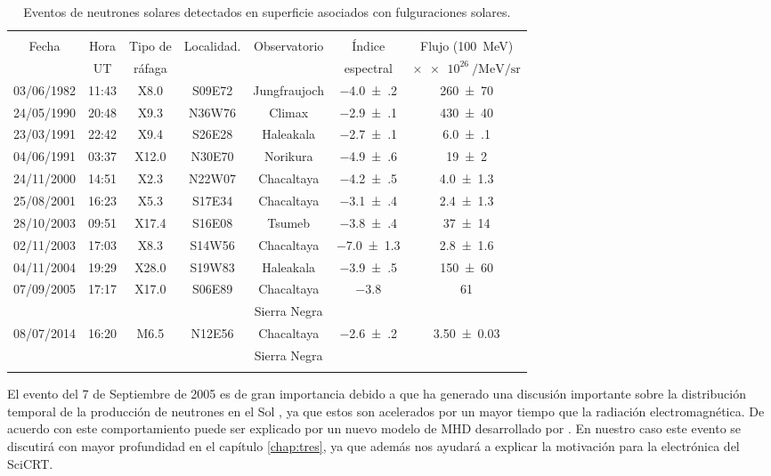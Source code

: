 \begin{table}
\caption{Eventos de neutrones solares detectados en superficie asociados con fulguraciones solares.}
\label{table:eventos-neutrones}

\begin{tabular}{ccccccc}
\multicolumn{7}{c}{}\\
\cmidrule(r){1-7}
Fecha & Hora & Tipo de & Localidad. & Observatorio & Índice & Flujo (\SI{100}{\mega\electronvolt})\\
 & UT & ráfaga &  &  & espectral & $\times\SI{e26}{\per\mega\electronvolt\per\steradian}$ \\
\addlinespace[5pt]
\cmidrule(r){1-7}
\num{03}/\num{06}/\num{1982} & 11:43 & X8.0 & S09E72 & Jungfraujoch & \num{-4.0(2)} & \num{260(70)}\\
\num{24}/\num{05}/\num{1990} & 20:48 & X9.3 & N36W76 & Climax & \num{-2.9(1)} & \num{430(40)}\\
\num{23}/\num{03}/\num{1991} & 22:42 & X9.4 & S26E28 & Haleakala & \num{-2.7(1)} & \num{6.0(1)}\\
\num{04}/\num{06}/\num{1991} & 03:37 & X12.0 & N30E70 & Norikura & \num{-4.9(6)} & \num{19(2)}\\
\num{24}/\num{11}/\num{2000} & 14:51 & X2.3 & N22W07 & Chacaltaya & \num{-4.2(5)} & \num{4.0(13)}\\
\num{25}/\num{08}/\num{2001} & 16:23 & X5.3 & S17E34 & Chacaltaya & \num{-3.1(4)} & \num{2.4(13)}\\
\num{28}/\num{10}/\num{2003} & 09:51 & X17.4 & S16E08 & Tsumeb & \num{-3.8(4)} & \num{37(14)}\\
\num{02}/\num{11}/\num{2003} & 17:03 & X8.3 & S14W56 & Chacaltaya & \num{-7.0(13)} & \num{2.8(16)}\\
\num{04}/\num{11}/\num{2004} & 19:29 & X28.0 & S19W83 & Haleakala & \num{-3.9(5)} & \num{150(60)}\\
\num{07}/\num{09}/\num{2005} & 17:17 & X17.0 & S06E89 & Chacaltaya & \num{-3.8} & \num{61}\\
 &  &  &  & Sierra Negra &  & \\
\num{08}/\num{07}/\num{2014} & 16:20 & M6.5 & N12E56 & Chacaltaya & \num{-2.6(2)} & \num{3.50(3)}\\
 &  &  &  & Sierra Negra &  & \\
\addlinespace[5pt]
\bottomrule

\end{tabular}
\end{table}

El evento del \num{7} de Septiembre de \num{2005} es de gran importancia debido a que ha generado una discusión importante sobre la distribución temporal de la producción de neutrones en el Sol \cite{sako06}, ya que estos son acelerados por un mayor tiempo que la radiación electromagnética. De acuerdo con \cite{watanabe09} este comportamiento puede ser explicado por un nuevo modelo de MHD desarrollado por  \cite{hua02}. En nuestro caso este evento se discutirá con mayor profundidad en el capítulo \ref{chap:tres}, ya que además nos ayudará a explicar la motivación para la electrónica del SciCRT.
